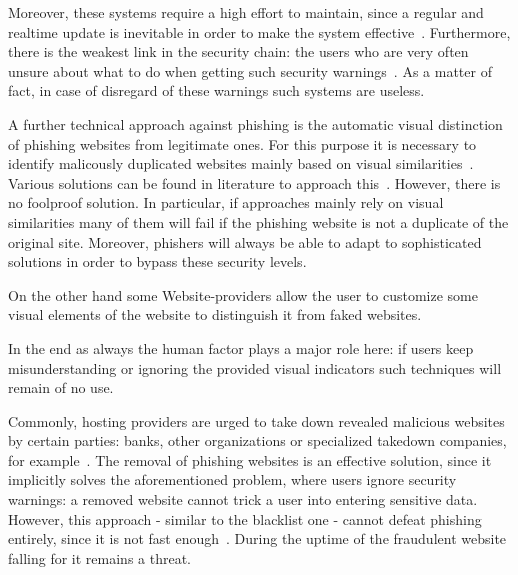 \begin{description}[leftmargin=0cm]
 Moreover, these systems require a high effort to maintain, since a regular and realtime update is inevitable in order to make the system effective~\cite{purkait2012phishing}. Furthermore, there is the weakest link in the security chain: the users who are very often unsure about what to do when getting such security warnings~\cite{bakhshi2009social}. As a matter of fact, in case of disregard of these warnings such systems are useless.
	\item[Visual distinction] A further technical approach against phishing is the automatic visual distinction of phishing websites from legitimate ones.
 For this purpose it is necessary to identify malicously duplicated websites mainly based on visual similarities~\cite{liu2006antiphishing}. Various solutions can be found in literature to approach this~\cite{chen2009fighting,chen2010detecting,zhang2011textual}. However, there is no foolproof solution.
 In particular, if approaches mainly rely on visual similarities many of them will fail if the phishing website is not a duplicate of the original site.
 Moreover, phishers will always be able to adapt to sophisticated solutions in order to bypass these security levels.

On the other hand some Website-providers allow the user to customize some visual elements of the website to distinguish it from faked websites.
 
In the end as always the human factor plays a major role here: if users keep misunderstanding or ignoring the provided visual indicators such techniques will remain of no use.

	\item[Takedown] Commonly, hosting providers are urged to take down revealed malicious websites by certain parties: banks, other organizations or specialized takedown companies, for example~\cite{moore2007examining}. The removal of phishing websites is an effective solution, since it implicitly solves the aforementioned problem, where users ignore security warnings: a removed website cannot trick a user into entering sensitive data.
 However, this approach - similar to the blacklist one - cannot defeat phishing entirely, since it is not fast enough~\cite{moore2007examining}. During the uptime of the fraudulent website falling for it remains a threat.

\end{description}

